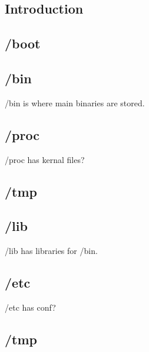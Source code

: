 
\subsection{Introduction}
 
\subsection{/boot}

\subsection{/bin}
/bin is where main binaries are stored.

\subsection{/proc}
/proc has kernal files?
 
\subsection{/tmp}

\subsection{/lib}
/lib has libraries for /bin.
 
\subsection{/etc}
/etc has conf?

\subsection{/tmp}

